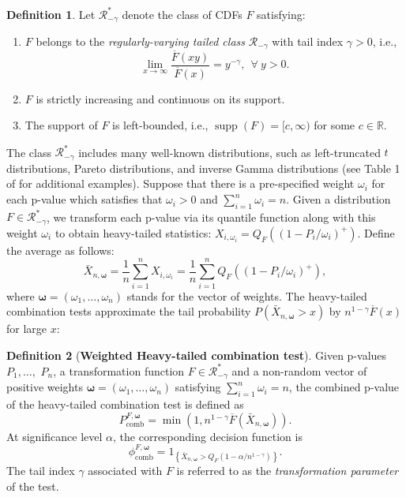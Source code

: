 \documentclass[12pt]{article}
\theoremstyle{plain}
\theoremstyle{plain}
\theoremstyle{definition}
\newtheorem{defn}{Definition}[section]
\begin{document}
\begin{defn}Let $\mathscr{R}_{-\gamma}^*$ denote the class of CDFs $F$ satisfying:
\begin{enumerate}[label=(\roman*)]
\item $F$ belongs to the \emph{regularly-varying tailed class} $\mathscr{R}_{-\gamma}$ with tail index $\gamma>0$, i.e.,
\begin{equation*}
\lim_{x\to\infty}\frac{\overline{F}(xy)}{\overline{F}(x)}=y^{-\gamma},~~\forall~y>0.
\end{equation*}
\item $F$ is strictly increasing and continuous on its support.
\item The support of $F$ is left-bounded, i.e., $\operatorname{supp}(F) = [c, \infty)$ for some $c \in \mathbb{R}$.
\end{enumerate}
\end{defn}
The class $\mathscr{R}_{-\gamma}^*$ includes many well-known distributions, such as left-truncated $t$ distributions, Pareto distributions, and inverse Gamma distributions (see Table 1 of \citet{gui2023aggregating} for additional examples). Suppose that there is a pre-specified weight $\omega_i$ for each p-value which satisfies that $\omega_i>0$ and $\sum_{i=1}^n\omega_i=n$. Given a distribution $F \in \mathscr{R}_{-\gamma}^*$, we transform each p-value via its quantile function along with this weight $\omega_i$ to obtain heavy-tailed statistics: $X_{i,\omega_i} = Q_F\left((1 - P_i/\omega_i)^+\right)$. Define the average as follows:
\begin{equation}
\label{eq:average_statistics}
\bar X_{n,\bm{\omega}}=\frac{1}{n}\sum_{i=1}^nX_{i,\omega_i}=\frac{1}{n}\sum_{i=1}^nQ_F\left((1 - P_i/\omega_i)^+\right),
\end{equation}
where $\bm{\omega}=(\omega_1,\dots,\omega_n)$ stands for the vector of weights. 
The heavy-tailed combination tests approximate the tail probability $P(\bar X_{n,\bm{\omega}} > x)$ by $n^{1-\gamma} \overline F(x)$ for large $x$: 
\begin{defn}[\textbf{Weighted Heavy-tailed combination test}] 
\label{def:weighted-combination-test}
Given p-values $P_1,\dots,$ $P_n$, a transformation function $F\in\mathscr{R}_{-\gamma}^*$ and a non-random vector of positive weights $\bm{\omega} = (\omega_1, \dots, \omega_n)$ satisfying $\sum_{i=1}^n\omega_i=n$, the combined p-value of the heavy-tailed combination test is defined as $$P_{\mathrm{comb}}^{F,\bm\omega}=\min\left(1, n^{1-\gamma} \overline F(\bar X_{n,\bm{\omega}})\right).$$ 
At significance level $\alpha$, the corresponding decision function is
\begin{equation*}
\phi_\mathrm{comb}^{F, \bm \omega} = 1_{\left\{\bar X_{n,\bm{\omega}}> Q_F\left(1-\alpha/n^{1-\gamma}\right)\right\}}.
\end{equation*}
The tail index $\gamma$ associated with $F$ is referred to as the \emph{transformation parameter} of the test.
\end{defn}
\end{document}
